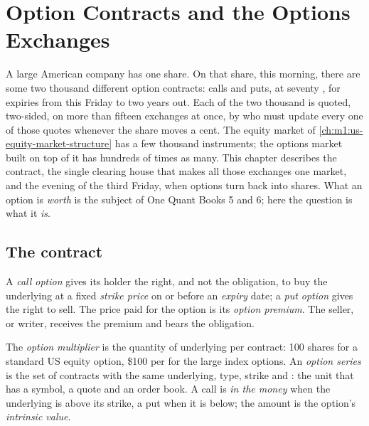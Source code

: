 \chapter{Option Contracts and the Options Exchanges}\label{ch:m1:option-contracts-and-exchanges}

A large American company has one share. On that share, this morning, there
are some two thousand different option contracts: calls and puts, at seventy
, for expiries from this Friday to two years out. Each of the
two thousand is quoted, two-sided, on more than fifteen exchanges at once,
by  who must update every one of those quotes whenever the share
moves a cent. The equity market of \cref{ch:m1:us-equity-market-structure}
has a few thousand instruments; the options market built on top of it has
hundreds of times as many. This chapter describes the contract, the single
clearing house that makes all those exchanges one market, and the evening of
the third Friday, when options turn back into shares. What an option is
\emph{worth} is the subject of One Quant Books 5 and 6; here the question is
what it \emph{is}.

\section{The contract}

\begin{definition}\label{def:m1:option-contracts-and-exchanges:option}
A \emph{call option} gives its holder the right, and not
the obligation, to buy the underlying at a fixed \emph{strike
price} on or before an \emph{expiry} date;
a \emph{put option} gives the right to sell. The price
paid for the option is its \emph{option premium}. The
seller, or writer, receives the premium and bears the obligation.
\end{definition}

\begin{definition}\label{def:m1:option-contracts-and-exchanges:series}
The \emph{option multiplier} is the quantity of
underlying per contract: 100 shares for a standard US equity option, \$100
per  for the large index options. An \emph{option
series} is the set of contracts with the same
underlying, type, strike and : the unit that has a symbol, a quote and
an order book. A call is \emph{in the money} when the
underlying is above its strike, a put when it is below; the amount is the
option's \emph{intrinsic value}.
\end{definition}

